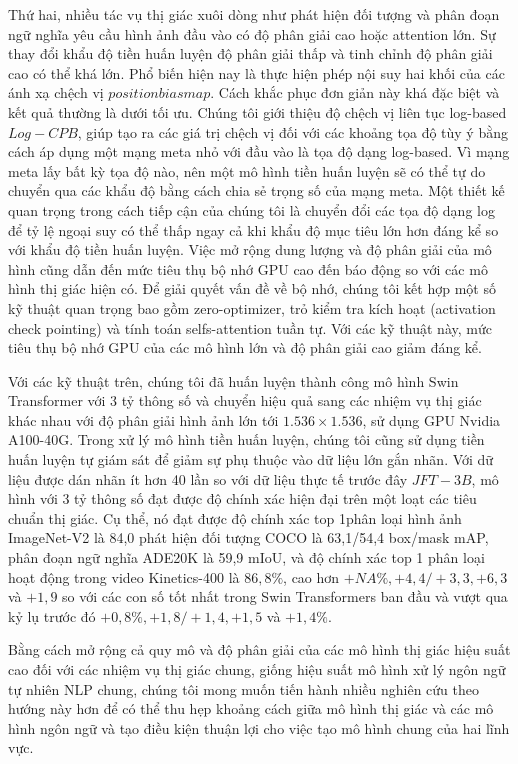 \documentclass[times, twoside]{zHenriquesLab-StyleBioRxiv}
\begin{document}
Thứ hai, nhiều tác vụ thị giác xuôi dòng như phát hiện đối tượng và phân đoạn ngữ nghĩa yêu cầu hình ảnh đầu vào có độ phân giải cao hoặc attention lớn. Sự thay đổi khẩu độ tiền huấn luyện độ phân giải thấp và tinh chỉnh độ phân giải cao có thể khá lớn. Phổ biến hiện nay là thực hiện phép nội suy hai khối của các ánh xạ chệch vị \(position bias map\). Cách khắc phục đơn giản này khá đặc biệt và kết quả thường là dưới tối ưu. Chúng tôi giới thiệu độ chệch vị liên tục log-based \(Log-CPB\), giúp tạo ra các giá trị chệch vị đối với các khoảng tọa độ tùy ý bằng cách áp dụng một mạng meta nhỏ với đầu vào là tọa độ dạng log-based. Vì mạng meta lấy bất kỳ tọa độ nào, nên một mô hình tiền huấn luyện sẽ có thể tự do chuyển qua các khẩu độ bằng cách chia sẻ trọng số của mạng meta. Một thiết kế quan trọng trong cách tiếp cận của chúng tôi là chuyển đổi các tọa độ dạng log để tỷ lệ ngoại suy có thể thấp ngay cả khi khẩu độ mục tiêu lớn hơn đáng kể so với khẩu độ tiền huấn luyện. Việc mở rộng dung lượng và độ phân giải của mô hình cũng dẫn đến mức tiêu thụ bộ nhớ GPU cao đến báo động so với các mô hình thị giác hiện có. Để giải quyết vấn đề về bộ nhớ, chúng tôi kết hợp một số kỹ thuật quan trọng bao gồm zero-optimizer, trỏ kiểm tra kích hoạt (activation check pointing) và tính toán selfs-attention tuần tự. Với các kỹ thuật này, mức tiêu thụ bộ nhớ GPU của các mô hình lớn và độ phân giải cao giảm đáng kể.

Với các kỹ thuật trên, chúng tôi đã huấn luyện thành công mô hình Swin Transformer với 3 tỷ thông số và chuyển hiệu quả sang các nhiệm vụ thị giác khác nhau với độ phân giải hình ảnh lớn tới $1.536 \times 1.536$, sử dụng GPU Nvidia A100-40G. Trong xử lý mô hình tiền huấn luyện, chúng tôi cũng sử dụng tiền huấn luyện tự giám sát để giảm sự phụ thuộc vào dữ liệu lớn gắn nhãn. Với dữ liệu được dán nhãn ít hơn 40 lần so với dữ liệu thực tế trước đây \(JFT-3B\), mô hình với 3 tỷ thông số đạt được độ chính xác hiện đại trên một loạt các tiêu chuẩn thị giác. Cụ thể, nó đạt được độ chính xác top 1phân loại hình ảnh ImageNet-V2 là 84,0 phát hiện đối tượng COCO là 63,1/54,4 box/mask mAP, phân đoạn ngữ nghĩa ADE20K là 59,9 mIoU, và độ chính xác top 1 phân loại hoạt động trong video Kinetics-400 là  $86,8\%$, cao hơn $+ NA\%, + 4,4 / + 3,3, +6,3$ và $+1,9$ so với các con số tốt nhất trong Swin Transformers ban đầu và vượt qua kỷ lụ trước đó $+ 0,8\%, + 1,8 / + 1,4, +1,5$ và $+ 1,4\%$.

Bằng cách mở rộng cả quy mô và độ phân giải của các mô hình thị giác hiệu suất cao đối với các nhiệm vụ thị giác chung, giống hiệu suất mô hình xử lý ngôn ngữ tự nhiên NLP chung, chúng tôi mong muốn tiến hành nhiều nghiên cứu theo hướng này hơn để có thể thu hẹp khoảng cách giữa mô hình thị giác và các mô hình ngôn ngữ và tạo điều kiện thuận lợi cho việc tạo mô hình chung của hai lĩnh vực.
\end{document}
